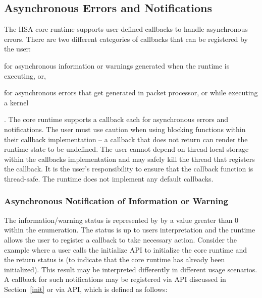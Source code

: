 \begin{DIFnomarkup}
\hypertarget{asyncerror}{}\subsection{Asynchronous Errors and
Notifications}\label{asyncerror}
\end{DIFnomarkup}

The HSA core runtime supports user-defined callbacks to handle
asynchronous errors. There are two different categories of callbacks
that can be registered by the user: \begin{inparaenum}[(i)] \item
for asynchronous information or warnings generated when the runtime
is executing, or, \item for asynchronous errors that get generated
in packet processor, or while executing a kernel \end{inparaenum}.
The core runtime supports a callback each for asynchronous errors
and notifications.
The user must use caution when using blocking functions within their
callback implementation -- a callback that does not return can
render the runtime state to be undefined. The user cannot depend on
thread local storage within the callbacks implementation and may
safely kill the thread that registers the callback. It is the user's
responsibility to ensure that the callback function is thread-safe.
The runtime does not implement any default callbacks.

\subsubsection{Asynchronous Notification of Information or
Warning}\label{asynnotif}

The information/warning status is represented by by a value greater
than 0 within the  enumeration. The status is
up to users interpretation and the runtime allows the user to
register a callback to take necessary action. Consider the example
where a user calls the initialize API to initialize the core runtime
and the return status is
 (to indicate that
the core runtime has already been initialized). This result may be
interpreted differently in different usage scenarios. A callback for
such notifications may be registered via  API
discussed in Section~\ref{init} or via
 API, which is defined
as follows:

